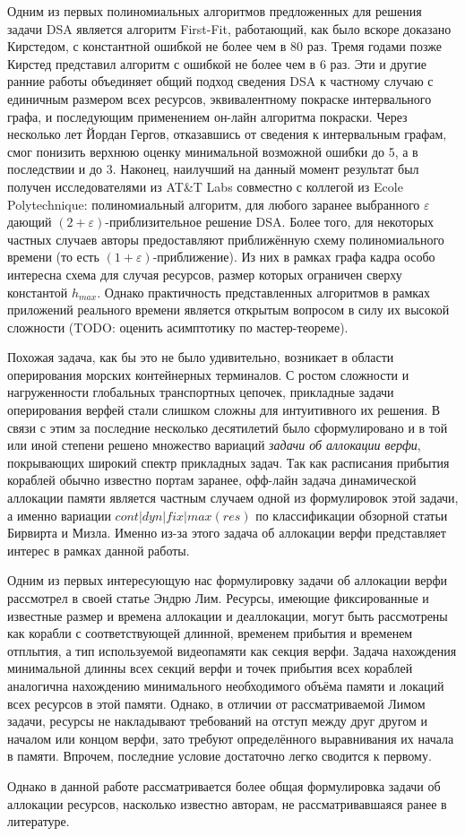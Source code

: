Одним из первых полиномиальных алгоритмов предложенных для решения задачи DSA является алгоритм First-Fit\cite{chrobak_packing_1988}, работающий, как было вскоре доказано Кирстедом, с константной ошибкой не более чем в 80 раз\cite{kierstead_linearity_1988}. Тремя годами позже Кирстед представил алгоритм с ошибкой не более чем в 6 раз\cite{kierstead_polynomial_1991}. Эти и другие ранние работы объединяет общий подход сведения DSA к частному случаю с единичным размером всех ресурсов, эквивалентному покраске интервального графа, и последующим применением он-лайн алгоритма покраски. Через несколько лет Йордан Гергов, отказавшись от сведения к интервальным графам, смог понизить верхнюю оценку минимальной возможной ошибки до 5\cite{gergov_approximation_1996}, а в последствии и до 3\cite{gergov_algorithms_1999}. Наконец, наилучший на данный момент результат был получен исследователями из AT\&T Labs совместно с коллегой из Ecole Polytechnique\cite{buchsbaum_opt_2003}: полиномиальный алгоритм, для любого заранее выбранного $\varepsilon$ дающий $(2+\varepsilon)$-приблизительное решение DSA. Более того, для некоторых частных случаев авторы предоставляют приближённую схему полиномиального времени (то есть $(1+\varepsilon)$-приближение). Из них в рамках графа кадра особо интересна схема для случая ресурсов, размер которых ограничен сверху константой $h_{max}$. Однако практичность представленных алгоритмов в рамках приложений реального времени является открытым вопросом в силу их высокой сложности (TODO: оценить асимптотику по мастер-теореме).

Похожая задача, как бы это не было удивительно, возникает в области оперирования морских контейнерных терминалов. С ростом сложности и нагруженности глобальных транспортных цепочек, прикладные задачи оперирования верфей стали слишком сложны для интуитивного их решения. В связи с этим за последние несколько десятилетий было сформулировано и в той или иной степени решено множество вариаций \textit{задачи об аллокации верфи}, покрывающих широкий спектр прикладных задач. Так как расписания прибытия кораблей обычно известно портам заранее, офф-лайн задача динамической аллокации памяти является частным случаем одной из формулировок этой задачи, а именно вариации $cont|dyn|fix|max(res)$ по классификации обзорной статьи Бирвирта и Мизла\cite{BIERWIRTH2010615}. Именно из-за этого задача об аллокации верфи представляет интерес в рамках данной работы.

Одним из первых интересующую нас формулировку задачи об аллокации верфи рассмотрел в своей статье Эндрю Лим\cite{LIM1998105}. Ресурсы, имеющие фиксированные и известные размер и времена аллокации и деаллокации, могут быть рассмотрены как корабли с соответствующей длинной, временем прибытия и временем отплытия, а тип используемой видеопамяти как секция верфи. Задача нахождения минимальной длинны всех секций верфи и точек прибытия всех кораблей аналогична нахождению минимального необходимого объёма памяти и локаций всех ресурсов в этой памяти. Однако, в отличии от рассматриваемой Лимом задачи, ресурсы не накладывают требований на отступ между друг другом и началом или концом верфи, зато требуют определённого выравнивания их начала в памяти. Впрочем, последние условие достаточно легко сводится к первому.

Однако в данной работе рассматривается более общая формулировка задачи об аллокации ресурсов, насколько известно авторам, не рассматривавшаяся ранее в литературе.

